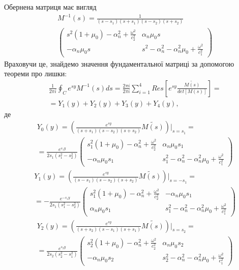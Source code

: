 Обернена матриця має вигляд
\begin{align}
    &M^{-1}(s)= \frac{1}{(s - s_1)(s + s_1)(s - s_2)(s + s_2)} \nonumber \\
    &\begin{pmatrix}
        s^2 (1 + \mu_0) -\alpha_n^2 + \frac{\omega^2}{c_2^2} & \alpha_n \mu_0 s \\
        -\alpha_n \mu_0 s & s^2 - \alpha_n^2 - \alpha_n^2\mu_0 + \frac{\omega^2}{c_1^2}
    \end{pmatrix}
\end{align}
Враховучи це, знайдемо значення фундаментальної матриці за допомогою теореми про лишки:
\begin{align*}
    &\frac{1}{2\pi i} \oint_C e^{sy} M^{-1}(s)ds = \frac{2 \pi i}{2 \pi i} \sum_{i=1}^{4} Res\left[ e^{sy} \frac{\widetilde{M(s)}}{det[M(s)]} \right] = \\
    & = Y_1(y) + Y_2(y) + Y_3(y) + Y_4(y),
\end{align*}
де
\begin{align}\label{fund_mat_0_gen}
    &Y_0(y) =  \left( \frac{e^{sy}}{(s+s_1)(s - s_2)(s + s_2)} \widetilde{M(s)} \right) \Big|_{s=s_1} = \nonumber \\
    &=\frac{e^{s_1 y}}{2s_1 (s_1^2 - s_2^2)} \begin{pmatrix}
        s_1^2 (1 + \mu_0) -\alpha_n^2 + \frac{\omega^2}{c_2^2} & \alpha_n \mu_0 s_1 \\
        -\alpha_n \mu_0 s_1 & s_1^2 - \alpha_n^2 - \alpha_n^2\mu_0 + \frac{\omega^2}{c_1^2}
    \end{pmatrix}
\end{align}
\begin{align}\label{fund_mat_1_gen}
    &Y_1(y) =  \left( \frac{e^{sy}}{(s-s_1)(s - s_2)(s + s_2)} \widetilde{M(s)} \right) \Big|_{s=-s_1} = \nonumber \\
    &=-\frac{e^{-s_1 y}}{2s_1 (s_1^2 - s_2^2)} \begin{pmatrix}
        s_1^2 (1 + \mu_0) -\alpha_n^2 + \frac{\omega^2}{c_2^2} & -\alpha_n \mu_0 s_1 \\
        \alpha_n \mu_0 s_1 & s_1^2 - \alpha_n^2 - \alpha_n^2\mu_0 + \frac{\omega^2}{c_1^2}
    \end{pmatrix}
\end{align}
\begin{align}\label{fund_mat_2_gen}
    &Y_2(y) =  \left( \frac{e^{sy}}{(s+s_2)(s - s_1)(s + s_1)} \widetilde{M(s)} \right) \Big|_{s=s_2} = \nonumber \\
    &=\frac{e^{s_2 y}}{2s_2 (s_2^2 - s_1^2)} \begin{pmatrix}
        s_2^2 (1 + \mu_0) -\alpha_n^2 + \frac{\omega^2}{c_2^2} & \alpha_n \mu_0 s_2 \\
        -\alpha_n \mu_0 s_2 & s_2^2 - \alpha_n^2 - \alpha_n^2\mu_0 + \frac{\omega^2}{c_1^2}
    \end{pmatrix}
\end{align}

